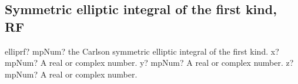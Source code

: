 %
%
%
%
%
%
%
%
%



\subsection{Symmetric elliptic integral of the first kind, RF}

\begin{mpFunctionsExtract}
	\mpFunctionThree
	{elliprf? mpNum? the Carlson symmetric elliptic integral of the first kind.}
	{x? mpNum? A real or complex number.}	
	{y? mpNum? A real or complex number.}
	{z? mpNum? A real or complex number.}	
\end{mpFunctionsExtract}


